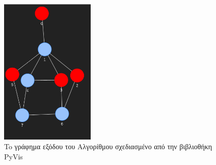 

\begin{figure}[H]
	\centering
	\includegraphics[width=0.4\textwidth]{pictures/at-free-graph-ind-output-pyvis.png} 
	\caption{To γράφημα εξόδου του Αλγορίθμου σχεδιασμένο από την βιβλιοθήκη PyVis}
	\label{fig:at-free-graph-ind-output-pyvis}
\end{figure}


